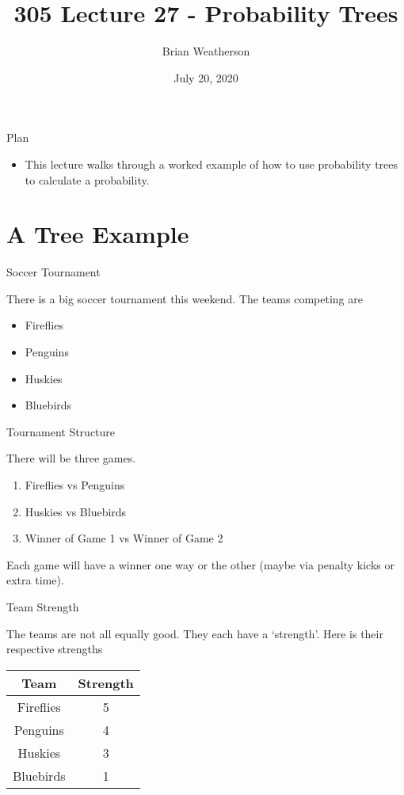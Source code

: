 \documentclass[
  ignorenonframetext,
]{beamer}
\title{305 Lecture 27 - Probability Trees}
\author{Brian Weatherson}
\date{July 20, 2020}
\providecommand{\tightlist}{%
  \setlength{\itemsep}{0pt}\setlength{\parskip}{0pt}}
\renewcommand{\,}{\text{, }}
\begin{document}
\frame{\titlepage}

\begin{frame}{Plan}
\protect\hypertarget{plan}{}

\begin{itemize}
\tightlist
\item
  This lecture walks through a worked example of how to use probability
  trees to calculate a probability.
\end{itemize}

\end{frame}

\hypertarget{a-tree-example}{%
\section{A Tree Example}\label{a-tree-example}}

\begin{frame}{Soccer Tournament}
\protect\hypertarget{soccer-tournament}{}

There is a big soccer tournament this weekend. The teams competing are

\begin{itemize}
\tightlist
\item
  Fireflies
\item
  Penguins
\item
  Huskies
\item
  Bluebirds
\end{itemize}

\end{frame}

\begin{frame}{Tournament Structure}
\protect\hypertarget{tournament-structure}{}

There will be three games.

\begin{enumerate}
\tightlist
\item
  Fireflies vs Penguins
\item
  Huskies vs Bluebirds
\item
  Winner of Game 1 vs Winner of Game 2
\end{enumerate}

Each game will have a winner one way or the other (maybe via penalty
kicks or extra time).

\end{frame}

\begin{frame}{Team Strength}
\protect\hypertarget{team-strength}{}

The teams are not all equally good. They each have a `strength'. Here is
their respective strengths

\begin{longtable}[]{@{}cc@{}}
\toprule
Team & Strength\tabularnewline
\midrule
\endhead
Fireflies & 5\tabularnewline
Penguins & 4\tabularnewline
Huskies & 3\tabularnewline
Bluebirds & 1\tabularnewline
\bottomrule
\end{longtable}

\end{frame}
\end{document}
